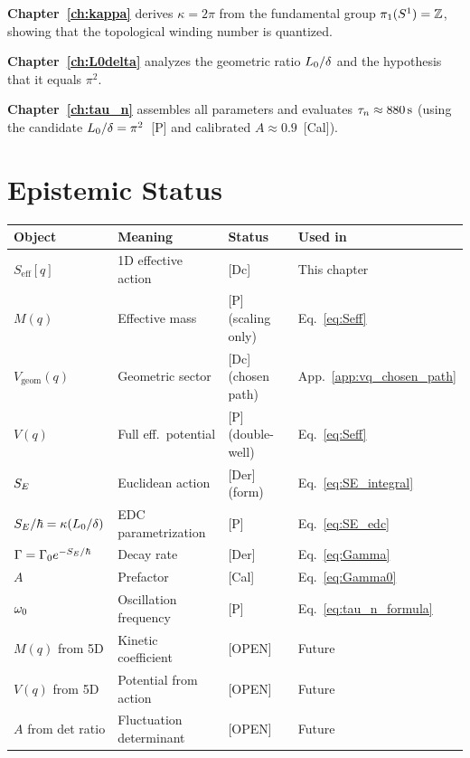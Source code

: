 \textbf{Chapter~\ref{ch:kappa}} derives $\kappa = 2\pi$ from the fundamental
group $\pi_1(S^1) = \mathbb{Z}$, showing that the topological winding
number is quantized.

\textbf{Chapter~\ref{ch:L0delta}} analyzes the geometric ratio $L_0/\delta$
and the hypothesis that it equals $\pi^2$.

\textbf{Chapter~\ref{ch:tau_n}} assembles all parameters and evaluates
$\tau_n \approx 880\,\mathrm{s}$ (using the candidate $L_0/\delta = \pi^2$~[P]
and calibrated $A \approx 0.9$~[Cal]).

\section{Epistemic Status}
\label{sec:instanton:epistemic}

\begin{center}
\begin{tabular}{llll}
\toprule
\textbf{Object} & \textbf{Meaning} & \textbf{Status} & \textbf{Used in} \\
\midrule
$S_{\text{eff}}[q]$ & 1D effective action & [Dc] & This chapter \\
$M(q)$ & Effective mass & [P] (scaling only) & Eq.~\eqref{eq:Seff} \\
$V_{\mathrm{geom}}(q)$ & Geometric sector & [Dc] (chosen path) & App.~\ref{app:vq_chosen_path} \\
$V(q)$ & Full eff.\ potential & [P] (double-well) & Eq.~\eqref{eq:Seff} \\
$S_E$ & Euclidean action & [Der] (form) & Eq.~\eqref{eq:SE_integral} \\
$S_E/\hbar = \kappa(L_0/\delta)$ & EDC parametrization & [P] & Eq.~\eqref{eq:SE_edc} \\
$\Gamma = \Gamma_0 e^{-S_E/\hbar}$ & Decay rate & [Der] & Eq.~\eqref{eq:Gamma} \\
$A$ & Prefactor & [Cal] & Eq.~\eqref{eq:Gamma0} \\
$\omega_0$ & Oscillation frequency & [P] & Eq.~\eqref{eq:tau_n_formula} \\
\midrule
$M(q)$ from 5D & Kinetic coefficient & [OPEN] & Future \\
$V(q)$ from 5D & Potential from action & [OPEN] & Future \\
$A$ from det ratio & Fluctuation determinant & [OPEN] & Future \\
\bottomrule
\end{tabular}
\end{center}

